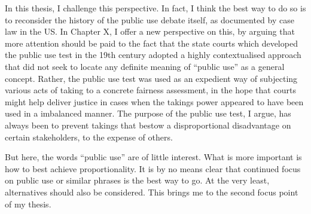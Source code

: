 In this thesis, I challenge this perspective. In fact, I think the best way to do so is to reconsider the history of the public use debate itself, as documented by case law in the US. In Chapter X, I offer a new perspective on this, by arguing that more attention should be paid to the fact that the state courts which developed the public use test in the 19th century adopted a highly contextualised approach that did not seek to locate any definite meaning of ``public use'' as a general concept. Rather, the public use test was used as an expedient way of subjecting various acts of taking to a concrete fairness assessment, in the hope that courts might help deliver justice in cases when the takings power appeared to have been used in a imbalanced manner. The purpose of the public use test, I argue, has always been to prevent takings that bestow a disproportional disadvantage on certain stakeholders, to the expense of others.

But here, the words ``public use'' are of little interest. What is more important is how to best achieve proportionality. It is by no means clear that continued focus on public use or similar phrases is the best way to go. At the very least, alternatives should also be considered. This brings me to the second focus point of my thesis.

